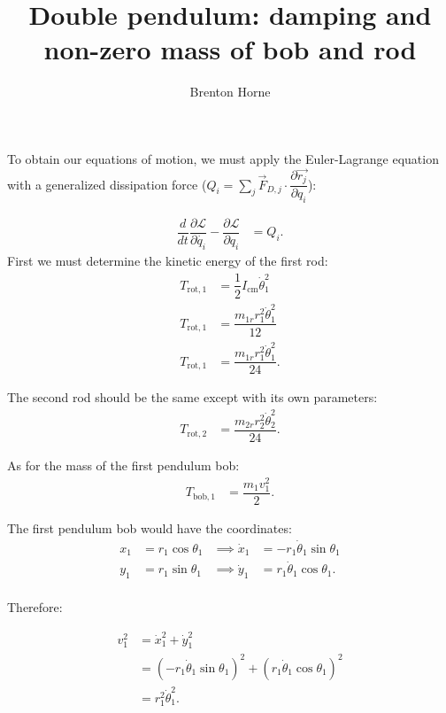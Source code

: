 \documentclass[12pt,a4paper,portrait]{article}
\date{}
\title{Double pendulum: damping and non-zero mass of bob and rod}
\author{Brenton Horne}
\begin{document}
	\maketitle
	
	To obtain our equations of motion, we must apply the Euler-Lagrange equation with a generalized dissipation force ($Q_i = \sum_j \vec{F}_{D,j} \cdot \dfrac{\partial \vec{r_j}}{\partial q_i}$):
	
	\begin{align}
		\dfrac{d}{dt}\dfrac{\partial \mathcal{L}}{\partial \dot{q_i}} - \dfrac{\partial \mathcal{L}}{\partial q_i} &= Q_i. \label{ELD}
	\end{align}
	First we must determine the kinetic energy of the first rod:
	\begin{align*}
		T_{\mathrm{rot}, 1} &= \dfrac{1}{2} I_{\mathrm{cm}} \dot{\theta}_1^2 \\
		T_{\mathrm{rot}, 1} &= \dfrac{m_{1r} r_1^2\dot{\theta}_1^2}{12} \\
		T_{\mathrm{rot}, 1} &= \dfrac{m_{1r} r_1^2\dot{\theta}_1^2}{24}.
	\end{align*}
	
	The second rod should be the same except with its own parameters:
	\begin{align*}
		T_{\mathrm{rot}, 2} &= \dfrac{m_{2r} r_2^2\dot{\theta}_2^2}{24}.
	\end{align*}
	
	As for the mass of the first pendulum bob:
	\begin{align*}
		T_{\mathrm{bob}, 1} &= \dfrac{m_1v_1^2}{2}.
	\end{align*}
	
	The first pendulum bob would have the coordinates:
	\begin{align*}
		x_1 &= r_1 \cos{\theta_1} &\implies \dot{x}_1 &= -r_1\dot{\theta}_1 \sin{\theta_1}\\
		y_1 &= r_1 \sin{\theta_1} &\implies \dot{y}_1 &= r_1 \dot{\theta}_1 \cos{\theta_1}. \\
	\end{align*}
	
	Therefore:
	
	\begin{align*}
		v_1^2 &= \dot{x}_1^2 + \dot{y}_1^2 \\
		&= \left(-r_1\dot{\theta}_1 \sin{\theta_1}\right)^2 + \left(r_1 \dot{\theta}_1 \cos{\theta_1}\right)^2 \\
		&= r_1^2 \dot{\theta}_1^2.
	\end{align*}
	
\end{document}
